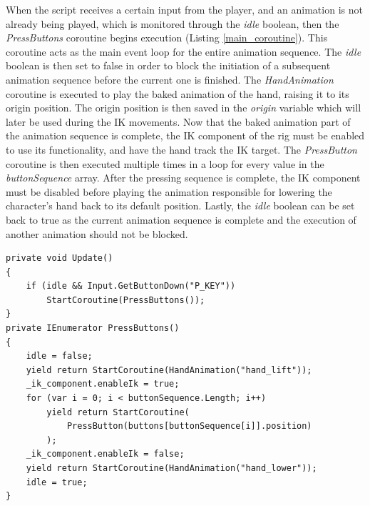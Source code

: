 When the script receives a certain input from the player, and an animation is
not already being played, which is monitored through the \textit{idle} boolean,
then the \textit{PressButtons} coroutine begins execution (Listing
\ref{main_coroutine}). This coroutine acts as the main event loop for the entire
animation sequence. The \textit{idle} boolean is then set to false in order to
block the initiation of a subsequent animation sequence before the current one
is finished. The \textit{HandAnimation} coroutine is executed to play the baked
animation of the hand, raising it to its origin position. The origin position is
then saved in the \textit{origin} variable which will later be used during the
IK movements. Now that the baked animation part of the animation sequence is
complete, the IK component of the rig must be enabled to use its functionality,
and have the hand track the IK target. The \textit{PressButton} coroutine is
then executed multiple times in a loop for every value in the
\textit{buttonSequence} array. After the pressing sequence is complete, the IK
component must be disabled before playing the animation responsible for lowering
the character's hand back to its default position. Lastly, the \textit{idle}
boolean can be set back to true as the current animation sequence is complete
and the execution of another animation should not be blocked.
\begin{lstlisting}[basicstyle=\linespread{0.9}\footnotesize\ttfamily, numbers=none,frame=single,
caption={Reading input, and executing the main coroutine \textit{PressButtons}
which plays the full animation sequence. \textit{IKPressButton.cs}},captionpos=t,
label=main_coroutine, language={[Sharp]c}, float=tp]
private void Update()
{
    if (idle && Input.GetButtonDown("P_KEY"))
        StartCoroutine(PressButtons());
}
private IEnumerator PressButtons()
{
    idle = false;
    yield return StartCoroutine(HandAnimation("hand_lift"));
    _ik_component.enableIk = true;
    for (var i = 0; i < buttonSequence.Length; i++)
        yield return StartCoroutine(
            PressButton(buttons[buttonSequence[i]].position)
        );
    _ik_component.enableIk = false;
    yield return StartCoroutine(HandAnimation("hand_lower"));
    idle = true;
}
\end{lstlisting}
